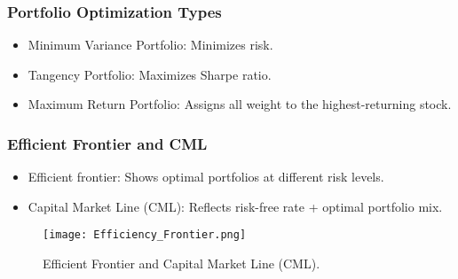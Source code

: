 \documentclass{beamer}
\begin{document}
\begin{frame}
\frametitle{Portfolio Optimization Types}
\begin{itemize}
    \item Minimum Variance Portfolio: Minimizes risk.
    \item Tangency Portfolio: Maximizes Sharpe ratio.
    \item Maximum Return Portfolio: Assigns all weight to the highest-returning stock.
\end{itemize}
\end{frame}

\begin{frame}
\frametitle{Efficient Frontier and CML}
\begin{itemize}
    \item Efficient frontier: Shows optimal portfolios at different risk levels.
    \item Capital Market Line (CML): Reflects risk-free rate + optimal portfolio mix.
\end{itemize}
\begin{figure}
    \centering
    \texttt{[image: Efficiency\_Frontier.png]}
    \caption{Efficient Frontier and Capital Market Line (CML).}
\end{figure}
\end{frame}
\end{document}
